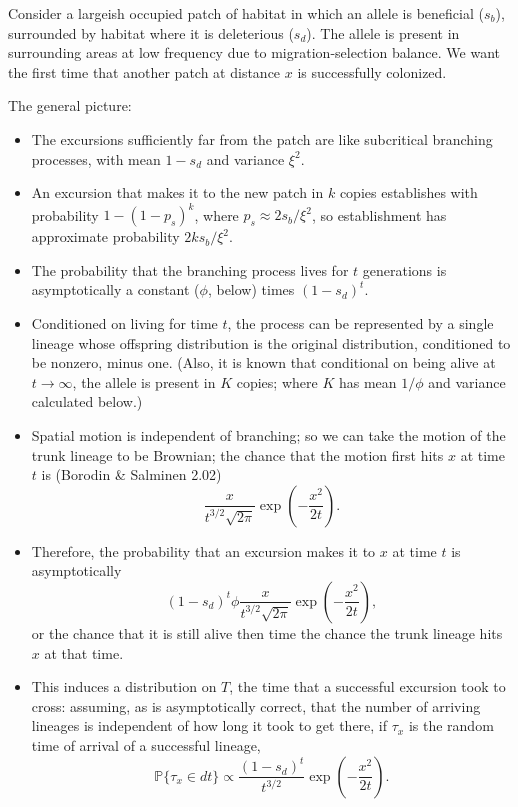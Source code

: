 \documentclass{article}
\renewcommand{\P}{\mathbb{P}}
\begin{document}
Consider a largeish occupied patch of habitat in which an allele is beneficial ($s_b$),
surrounded by habitat where it is deleterious ($s_d$).
The allele is present in surrounding areas at low frequency due to migration-selection balance.
We want the first time that another patch at distance $x$ is successfully colonized.

The general picture:
\begin{itemize}

\item The excursions sufficiently far from the patch are like subcritical branching processes,
with mean $1-s_d$ and variance $\xi^2$.

\item An excursion that makes it to the new patch in $k$ copies establishes with probability $1-(1-p_s)^k$,
where $p_s \approx 2s_b/\xi^2$, so establishment has approximate probability $2 k s_b / \xi^2$.

\item The probability that the branching process lives for $t$ generations is asymptotically a constant ($\phi$, below) times $(1-s_d)^t$.

\item Conditioned on living for time $t$, the process can be represented by a single lineage whose offspring distribution
is the original distribution, conditioned to be nonzero, minus one.
(Also, it is known that conditional on being alive at $t\to\infty$, the allele is present in $K$ copies; where $K$ has mean $1/\phi$ and variance calculated below.)

\item Spatial motion is independent of branching;
so we can take the motion of the trunk lineage to be Brownian;
the chance that the motion first hits $x$ at time $t$ is (Borodin \& Salminen 2.02)
\[
\frac{x}{t^{3/2}\sqrt{2\pi}} \exp\left(-\frac{x^2}{2t}\right) .
\]

\item Therefore, the probability that an excursion makes it to $x$ at time $t$ is asymptotically
\[
  (1-s_d)^t \phi \frac{x}{t^{3/2}\sqrt{2\pi}} \exp\left(-\frac{x^2}{2t}\right) ,
\]
or the chance that it is still alive then time the chance the trunk lineage hits $x$ at that time.

\item This induces a distribution on $T$, the time that a successful excursion took to cross:
assuming, as is asymptotically correct, that the number of arriving lineages is independent of how long it took to get there,
if $\tau_x$ is the random time of arrival of a successful lineage,
\[
 \P\{\tau_x \in dt\} \propto \frac{(1-s_d)^t}{t^{3/2}} \exp\left(-\frac{x^2}{2t}\right) .
\]



\end{itemize}
\end{document}
